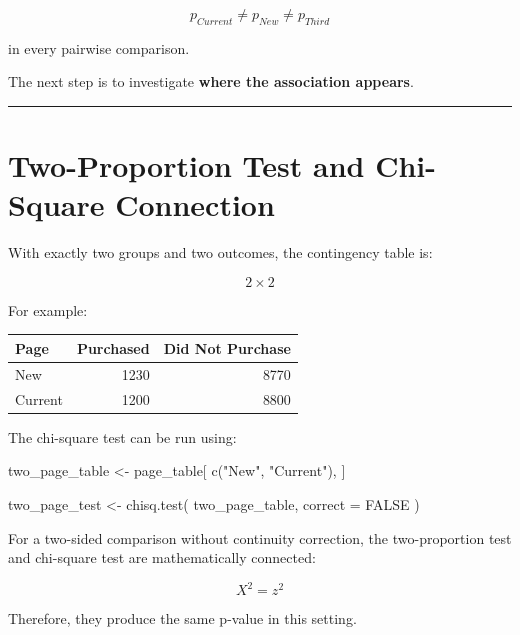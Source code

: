 \documentclass[
  letterpaper,
  DIV=11,
  numbers=noendperiod]{scrreprt}
\newenvironment{Shaded}{\begin{snugshade}}{\end{snugshade}}
\newcommand{\AttributeTok}[1]{\textcolor[rgb]{0.40,0.45,0.13}{#1}}
\newcommand{\ConstantTok}[1]{\textcolor[rgb]{0.56,0.35,0.01}{#1}}
\newcommand{\FunctionTok}[1]{\textcolor[rgb]{0.28,0.35,0.67}{#1}}
\newcommand{\NormalTok}[1]{\textcolor[rgb]{0.00,0.23,0.31}{#1}}
\newcommand{\OtherTok}[1]{\textcolor[rgb]{0.00,0.23,0.31}{#1}}
\newcommand{\StringTok}[1]{\textcolor[rgb]{0.13,0.47,0.30}{#1}}
\newcounter{none} %
\begin{document}
\[
p_{Current}\neq p_{New}\neq p_{Third}
\]

in every pairwise comparison.

The next step is to investigate \textbf{where the association appears}.

\begin{center}\rule{0.5\linewidth}{0.5pt}\end{center}


\chapter{Two-Proportion Test and Chi-Square
Connection}\label{two-proportion-test-and-chi-square-connection}

With exactly two groups and two outcomes, the contingency table is:

\[
2\times2
\]

For example:

{\def\LTcaptype{none} %
\begin{longtable}[]{@{}lrr@{}}
\toprule\noalign{}
Page & Purchased & Did Not Purchase \\
\midrule\noalign{}
\endhead
\bottomrule\noalign{}
\endlastfoot
New & 1230 & 8770 \\
Current & 1200 & 8800 \\
\end{longtable}
}

The chi-square test can be run using:

\begin{Shaded}
\begin{Highlighting}[]
\NormalTok{two\_page\_table }\OtherTok{\textless{}{-}}\NormalTok{ page\_table[}
    \FunctionTok{c}\NormalTok{(}\StringTok{"New"}\NormalTok{, }\StringTok{"Current"}\NormalTok{),}
\NormalTok{]}

\NormalTok{two\_page\_test }\OtherTok{\textless{}{-}} \FunctionTok{chisq.test}\NormalTok{(}
\NormalTok{    two\_page\_table,}
    \AttributeTok{correct =} \ConstantTok{FALSE}
\NormalTok{)}
\end{Highlighting}
\end{Shaded}

For a two-sided comparison without continuity correction, the
two-proportion test and chi-square test are mathematically connected:

\[
\boxed{
X^2=z^2
}
\]

Therefore, they produce the same p-value in this setting.
\end{document}
